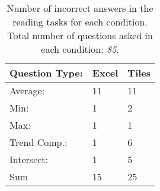 \begin{table}[]
\centering
\begin{tabular}{l|l|l}
Question Type: & Excel & Tiles \\
\hline
Average: & 11 & 11 \\
Min: & 1 & 2 \\
Max: & 1 & 1 \\
Trend Comp.: & 1 & 6 \\
Intersect: & 1 & 5 \\
\hline
Sum & 15 & 25
\end{tabular}
\label{tab:readerror}
\caption{Number of incorrect answers in the reading tasks for each condition. Total number of questions asked in each condition: \textit{85}.}
\end{table}